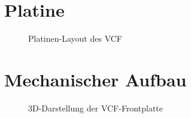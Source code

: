 \section{Platine}
\begin{figure}[h]
	\centering
	\setlength{\fboxsep}{1pt} %
	\setlength{\fboxrule}{1pt} %
	\caption{Platinen-Layout des VCF}
\end{figure}

\section{Mechanischer Aufbau}
\begin{figure}[h]
	\centering
	\setlength{\fboxsep}{1pt} %
	\setlength{\fboxrule}{1pt} %
	\caption{3D-Darstellung der VCF-Frontplatte}
\end{figure}
